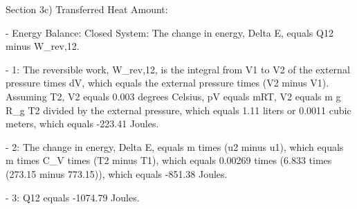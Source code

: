Section 3c) Transferred Heat Amount:

- Energy Balance: Closed System:
  The change in energy, Delta E, equals Q12 minus W_rev,12.

- 1:
  The reversible work, W_rev,12, is the integral from V1 to V2 of the external pressure times dV, which equals the external pressure times (V2 minus V1).
  Assuming T2, V2 equals 0.003 degrees Celsius,
  pV equals mRT,
  V2 equals m g R_g T2 divided by the external pressure,
  which equals 1.11 liters or 0.0011 cubic meters,
  which equals -223.41 Joules.

- 2:
  The change in energy, Delta E, equals m times (u2 minus u1), which equals m times C_V times (T2 minus T1),
  which equals 0.00269 times (6.833 times (273.15 minus 773.15)),
  which equals -851.38 Joules.

- 3:
  Q12 equals -1074.79 Joules.
